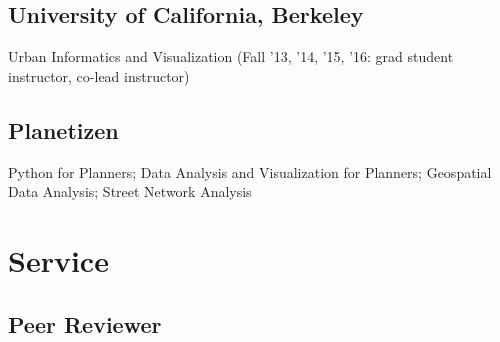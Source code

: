 \documentclass[12pt,letterpaper]{report}
\newcommand{\listitemspace}{0.15em}
\renewenvironment{itemize}
{\begin{list}{}{\setlength{\leftmargin}{0em}
				\setlength{\parskip}{0em}
				\setlength{\itemsep}{\listitemspace}
				\setlength{\parsep}{\listitemspace}}}
{\end{list}}
\begin{document}
\subsection*{University of California, Berkeley}

\begin{itemize}

\item Urban Informatics and Visualization (Fall '13, '14, '15, '16: grad student instructor, co-lead instructor)

\end{itemize}

\subsection*{Planetizen}

\begin{itemize}

\item Python for Planners; Data Analysis and Visualization for Planners; Geospatial Data Analysis; Street Network Analysis

\end{itemize}


\section*{Service}

\subsection*{Peer Reviewer}
\end{document}
